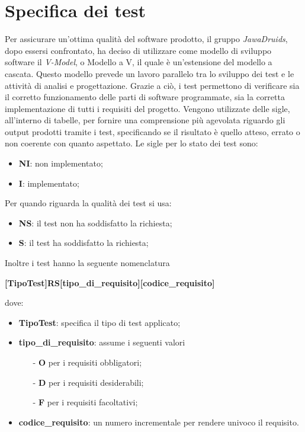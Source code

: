 \chapter{Specifica dei test} \label{SpecificaDeiTest}
Per assicurare un’ottima qualità del software prodotto, il gruppo \textit{JawaDruids}, dopo essersi confrontato, ha deciso di utilizzare come modello di sviluppo software il \textit{V-Model}, o Modello a V, il quale è un’estensione del modello a cascata.
Questo modello prevede un lavoro parallelo tra lo sviluppo dei test e le attività di analisi e progettazione.
Grazie a ciò, i test permettono di verificare sia il corretto funzionamento delle parti di software programmate, sia la corretta implementazione di tutti i requisiti del progetto.
Vengono utilizzate delle sigle, all’interno di tabelle, per fornire una comprensione più agevolata riguardo gli output prodotti tramite i test, specificando se il risultato è quello atteso, errato o non coerente con quanto aspettato.
Le sigle per lo stato dei test sono:
\begin{itemize}
	\item \textbf{NI}: non implementato;
	\item \textbf{I}: implementato;
\end{itemize}
Per quando riguarda la qualità dei test si usa:
\begin{itemize}
	\item \textbf{NS}: il test non ha soddisfatto la richiesta;
	\item \textbf{S}: il test ha soddisfatto la richiesta; 
\end{itemize}
Inoltre i test hanno la seguente nomenclatura
\begin{center}
	\textbf{[TipoTest]RS[tipo\_di\_requisito][codice\_requisito]}
\end{center}
dove:
\begin{itemize}
	\item \textbf{TipoTest}: specifica il tipo di test applicato;
	\item \textbf{tipo\_di\_requisito}: assume i seguenti valori
		\begin{itemize}
			\item[-] \textbf{O} per i requisiti obbligatori;
			\item[-] \textbf{D} per i requisiti desiderabili;
			\item[-] \textbf{F} per i requisiti facoltativi;
		\end{itemize}
	\item \textbf{codice\_requisito}: un numero incrementale per rendere univoco il requisito.
\end{itemize}

